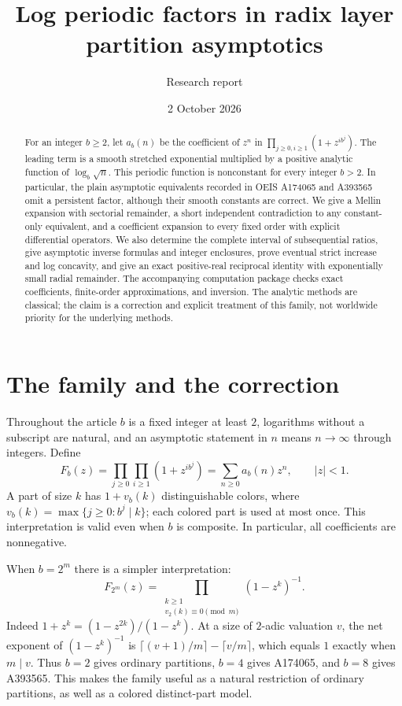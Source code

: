 \documentclass[11pt,letterpaper]{article}
\title{Log periodic factors in radix layer partition asymptotics}
\author{Research report}
\date{2 October 2026}
\numberwithin{equation}{section}
\theoremstyle{remark}\newtheorem{remark}[theorem]{Remark}
\begin{document}
\maketitle
\begin{abstract}
For an integer $b\ge2$, let $a_b(n)$ be the coefficient of $z^n$ in
$\prod_{j\ge0,i\ge1}(1+z^{i b^j})$. The leading term is a smooth stretched exponential multiplied by a positive analytic function of $\log_b\sqrt n$. This periodic function is nonconstant for every integer $b>2$. In particular, the plain asymptotic equivalents recorded in OEIS A174065 and A393565 omit a persistent factor, although their smooth constants are correct. We give a Mellin expansion with sectorial remainder, a short independent contradiction to any constant-only equivalent, and a coefficient expansion to every fixed order with explicit differential operators. We also determine the complete interval of subsequential ratios, give asymptotic inverse formulas and integer enclosures, prove eventual strict increase and log concavity, and give an exact positive-real reciprocal identity with exponentially small radial remainder. The accompanying computation package checks exact coefficients, finite-order approximations, and inversion. The analytic methods are classical; the claim is a correction and explicit treatment of this family, not worldwide priority for the underlying methods.
\end{abstract}

\section{The family and the correction}
\label{rlp:sec:intro}
Throughout the article $b$ is a fixed integer at least $2$, logarithms without a subscript are natural, and an asymptotic statement in $n$ means $n\to\infty$ through integers. Define
\begin{equation}\label{rlp:eq:product}
 F_b(z)=\prod_{j\ge0}\prod_{i\ge1}(1+z^{i b^j})
       =\sum_{n\ge0}a_b(n)z^n,\qquad |z|<1.
\end{equation}
A part of size $k$ has $1+v_b(k)$ distinguishable colors, where
$v_b(k)=\max\{j\ge0:b^j\mid k\}$; each colored part is used at most once. This interpretation is valid even when $b$ is composite. In particular, all coefficients are nonnegative.

When $b=2^m$ there is a simpler interpretation:
\begin{equation}\label{rlp:eq:telescope}
 F_{2^m}(z)=\prod_{\substack{k\ge1\\v_2(k)\equiv0\pmod m}}(1-z^k)^{-1}.
\end{equation}
Indeed $1+z^k=(1-z^{2k})/(1-z^k)$. At a size of $2$-adic valuation $v$, the net exponent of $(1-z^k)^{-1}$ is
$\lceil(v+1)/m\rceil-\lceil v/m\rceil$, which equals $1$ exactly when $m\mid v$. Thus $b=2$ gives ordinary partitions, $b=4$ gives A174065, and $b=8$ gives A393565. This makes the family useful as a natural restriction of ordinary partitions, as well as a colored distinct-part model.
\end{document}
